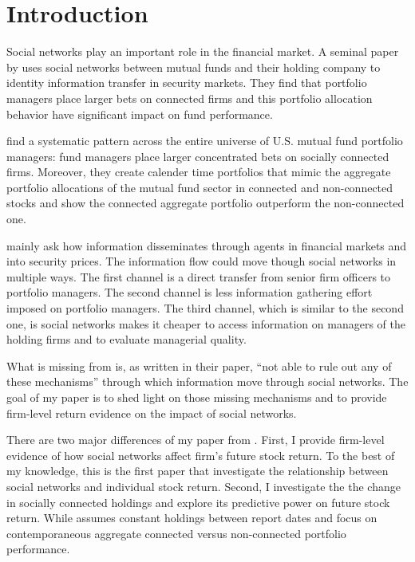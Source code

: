 \documentclass[11pt]{article}
\begin{document}
\section{Introduction}
\begin{doublespace}
Social networks play an important role in the financial market. A seminal paper by \cite{cohen2008small}
 uses social networks between mutual funds and their holding company to identity information transfer in security markets. They find that portfolio managers place larger bets on connected firms and this portfolio allocation behavior have significant impact on fund performance. 

 \cite{cohen2008small} find a systematic pattern across the entire universe of U.S. mutual fund portfolio managers: fund managers place larger concentrated bets on socially connected firms. Moreover, they create calender time portfolios that mimic the aggregate portfolio allocations of the mutual fund sector in connected and non-connected stocks and show the connected aggregate portfolio outperform the non-connected one. 

\cite{cohen2008small} mainly ask how information disseminates through agents in financial markets and into security prices. The information flow could move though social networks in multiple ways. The first channel is a direct transfer from senior firm officers to portfolio managers. The second channel is less information gathering effort imposed on portfolio managers.  The third channel, which is similar to the second one, is social networks makes it cheaper to access information on managers of the holding firms and to evaluate managerial quality. 

What is missing from \cite{cohen2008small} is, as written in their paper, ``not able to rule out any of these mechanisms'' through which information move through social networks. The goal of my paper is to shed light on those missing mechanisms and to provide firm-level return evidence on the impact of social networks. 

There are two major differences of my paper from \cite{cohen2008small}. First, I provide firm-level evidence of how social networks affect firm's future stock return. To the best of my knowledge, this is the first paper that investigate the relationship between social networks and individual stock return. Second, I investigate the the change in socially connected holdings and explore its predictive power on future stock return. While \cite{cohen2008small} assumes constant holdings between report dates and focus on contemporaneous aggregate connected versus non-connected portfolio performance. 


\end{doublespace}
\end{document}
